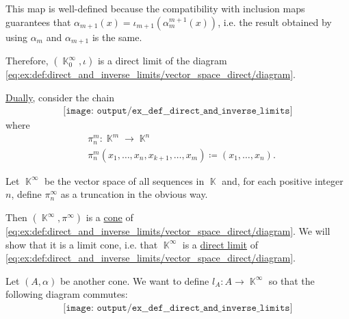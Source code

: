 \begin{example}
\begin{thmenum}
    This map is well-defined because the compatibility with inclusion maps guarantees that \( \alpha_{m+1}(x) = \iota_{m+1}(\alpha^{m+1}_m(x)) \), i.e. the result obtained by using \( \alpha_m \) and \( \alpha_{m+1} \) is the same.

    Therefore, \( (\BbbK_0^\infty, \iota) \) is a direct limit of the diagram \eqref{eq:ex:def:direct_and_inverse_limits/vector_space_direct/diagram}.

     \hyperref[thm:categorical_principle_of_duality]{Dually}, consider the chain
    \begin{equation}\label{eq:ex:def:direct_and_inverse_limits/vector_space_inverse/diagram}
      \begin{aligned}
        \texttt{[image: output/ex\_\_def\_\_direct\_and\_inverse\_limits]}
      \end{aligned}
    \end{equation}
    where
    \begin{equation*}
      \begin{aligned}
        &\pi_n^m: \BbbK^m \to \BbbK^n \\
        &\pi_n^m(x_1, \ldots, x_n, x_{k+1}, \ldots, x_m) \coloneqq (x_1, \ldots, x_n).
      \end{aligned}
    \end{equation*}

    Let \( \BbbK^\infty \) be the vector space of all sequences in \( \BbbK \) and, for each positive integer \( n \), define \( \pi_n^\infty \) as a truncation in the obvious way.

    Then \( (\BbbK^\infty, \pi^\infty) \) is a \hyperref[def:category_of_cones/cone]{cone} of \eqref{eq:ex:def:direct_and_inverse_limits/vector_space_direct/diagram}. We will show that it is a limit cone, i.e. that \( \BbbK^\infty \) is a \hyperref[def:direct_and_inverse_limits]{direct limit} of \eqref{eq:ex:def:direct_and_inverse_limits/vector_space_direct/diagram}.

    Let \( (A, \alpha) \) be another cone. We want to define \( l_A: A \to \BbbK^\infty \) so that the following diagram commutes:
    \begin{equation}\label{eq:ex:def:direct_and_inverse_limits/vector_space_inverse/limit}
      \begin{aligned}
        \texttt{[image: output/ex\_\_def\_\_direct\_and\_inverse\_limits]}
      \end{aligned}
    \end{equation}


\end{thmenum}
\end{example}
